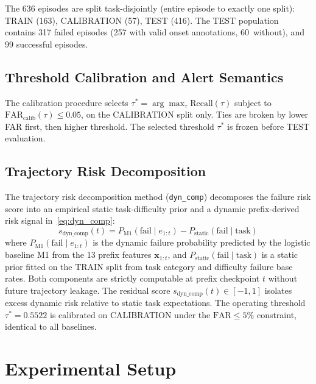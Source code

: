 \documentclass[conference]{IEEEtran}
\begin{document}
The 636 episodes are split task-disjointly (entire episode to exactly
one split): TRAIN (163), CALIBRATION (57), TEST (416). The TEST
population contains 317 failed episodes (257 with valid onset
annotations, 60~without), and 99 successful episodes.

\subsection{Threshold Calibration and Alert Semantics}

The calibration procedure selects
$\tau^* = \arg\max_\tau \mathrm{Recall}(\tau)$ subject to
$\mathrm{FAR}_{\mathrm{calib}}(\tau) \leq 0.05$, on the CALIBRATION
split only. Ties are broken by lower FAR first, then higher threshold.
The selected threshold $\tau^*$ is frozen before TEST evaluation.

\subsection{Trajectory Risk Decomposition}

The trajectory risk decomposition method (\texttt{dyn\_comp}) decomposes
the failure risk score into an empirical static task-difficulty prior
and a dynamic prefix-derived risk signal in~\eqref{eq:dyn_comp}:
\begin{equation}
s_{\mathrm{dyn\_comp}}(t) = P_{\mathrm{M1}}(\mathrm{fail} \mid e_{1:t}) - P_{\mathrm{static}}(\mathrm{fail} \mid \mathrm{task})
\label{eq:dyn_comp}
\end{equation}
where $P_{\mathrm{M1}}(\mathrm{fail} \mid e_{1:t})$ is the dynamic
failure probability predicted by the logistic baseline M1 from the 13
prefix features $\mathbf{x}_{1:t}$, and
$P_{\mathrm{static}}(\mathrm{fail} \mid \mathrm{task})$ is a static prior
fitted on the TRAIN split from task category and difficulty failure base
rates. Both components are strictly computable at prefix checkpoint $t$
without future trajectory leakage. The residual score
$s_{\mathrm{dyn\_comp}}(t) \in [-1, 1]$ isolates excess dynamic risk
relative to static task expectations. The operating threshold
$\tau^* = 0.5522$ is calibrated on CALIBRATION under the
$\mathrm{FAR} \leq 5\%$ constraint, identical to all baselines.

\section{Experimental Setup}
\end{document}
